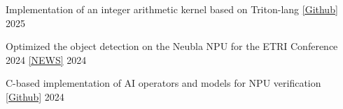 


\begin{cvprojects}
  \cvproject
    {Implementation of an integer arithmetic kernel based on Triton-lang}
    {
    \href{https://gitlab.com/ones-ai/triton-kernels-for-quantization}
    {[Github]}
    }
    {2025}

  \cvproject
    {Optimized the object detection on the Neubla NPU for the ETRI Conference 2024}
    {
    \href{https://www.cctoday.co.kr/news/articleView.html?idxno=2197169}
    {[NEWS]}
    }
    {2024}

  \cvproject
    {C-based implementation of AI operators and models for NPU verification}
    {
    \href{https://gitlab.com/ones-ai/arx-api}
    {[Github]}
    }
    {2024}


    
\end{cvprojects}







